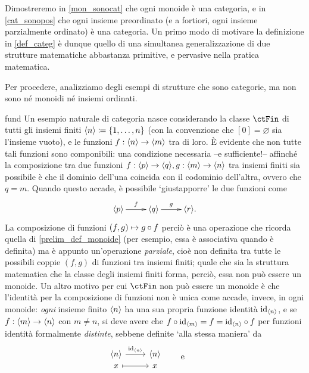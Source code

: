 Dimostreremo in \ref{mon_sonocat} che ogni monoide è una categoria, e in \ref{cat_sonopos} che ogni insieme preordinato (e a fortiori, ogni insieme parzialmente ordinato) è una categoria. Un primo modo di motivare la definizione in \ref{def_categ} è dunque quello di una simultanea generalizzazione di due strutture matematiche abbastanza primitive, e pervasive nella pratica matematica.

Per procedere, analizziamo degli esempi di strutture che sono categorie, ma non sono né monoidi né insiemi ordinati.
\begin{hExample}{fund}\label{protoex_finset}
	Un esempio naturale di categoria nasce considerando la classe \(\ctFin\) di tutti gli insiemi finiti \(\bkt{n}\defeq \{\iter n\}\) (con la convenzione che \([0]=\varnothing\) sia l'insieme vuoto), e le funzioni \(f : \langle n\rangle \to \langle m\rangle\) tra di loro. \`E evidente che non tutte tali funzioni sono componibili: una condizione necessaria --e sufficiente!-- affinché la composizione tra due funzioni \(f : \langle p\rangle \to \langle q\rangle,g : \langle m\rangle \to \langle n\rangle\) tra insiemi finiti sia possibile è che il dominio dell'una coincida con il codominio dell'altra, ovvero che \(q=m\). Quando questo accade, è possibile `giustapporre' le due funzioni come
	\[\xymatrix{
			\bkt{p} \ar[r]^-f & \bkt{q} \ar[r]^-g & \bkt{r}.
		}\]
	La composizione di funzioni \((f,g)\mapsto g\circ f\) perciò è una operazione che ricorda quella di \ref{prelim_def_monoide} (per esempio, essa è associativa quando è definita) ma è appunto un'operazione \emph{parziale}, cioè non definita tra tutte le possibili coppie \((f,g)\) di funzioni tra insiemi finiti; quale che sia la struttura matematica che la classe degli insiemi finiti forma, perciò, essa non può essere un monoide. Un altro motivo per cui \(\ctFin\) non può essere un monoide è che l'identità per la composizione di funzioni non è unica come accade, invece, in ogni monoide: \emph{ogni} insieme finito \(\langle n\rangle\) ha una sua propria funzione identità \(\mathrm{id}_{\langle n\rangle}\), e se \(f : \langle m\rangle\to \langle n\rangle\) con \(m\ne n\), si deve avere che \(f\circ \mathrm{id}_{\langle m\rangle}=f=\mathrm{id}_{\langle n\rangle}\circ f\) per funzioni identità formalmente \emph{distinte}, sebbene definite `alla stessa maniera' da
	\[
		\begin{tikzcd}[row sep=0]
			{\bkt{n}} \ar{r}{\id_{\bkt{n}}} & {\bkt{n}} \\
			x \ar[mapsto]{r} & x
		\end{tikzcd}
		\qquad\mbox{e}\qquad
		\begin{tikzcd}[row sep=0]

\end{tikzcd}\]
\end{hExample}
